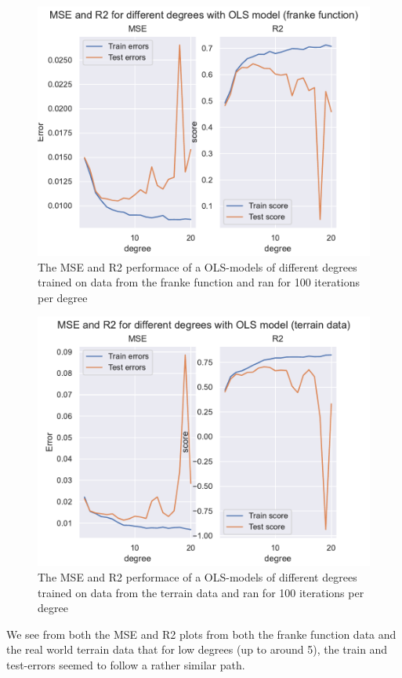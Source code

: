 \documentclass[12pt]{article}
\begin{document}
\begin{figure}[H]
    \centering
    \includegraphics[width=0.8\columnwidth]{../src/output/ols_mse_r2_franke_function.pdf}
    \caption{The MSE and R2 performace of a OLS-models of different degrees trained on data from the franke function and ran for 100 iterations per degree}
    \label{fig:ols_mse_r2_franke}
\end{figure}

\begin{figure}[H]
    \centering
    \includegraphics[width=0.8\columnwidth]{../src/output/ols_mse_r2_terrain_data.pdf}
    \caption{The MSE and R2 performace of a OLS-models of different degrees trained on data from the terrain data and ran for 100 iterations per degree}
    \label{fig:ols_mse_r2_terrain}
\end{figure}

We see from both the MSE and R2 plots from both the franke function data and the real world terrain data that for low degrees (up to around 5), the train and test-errors seemed to follow a rather similar path.
\end{document}
